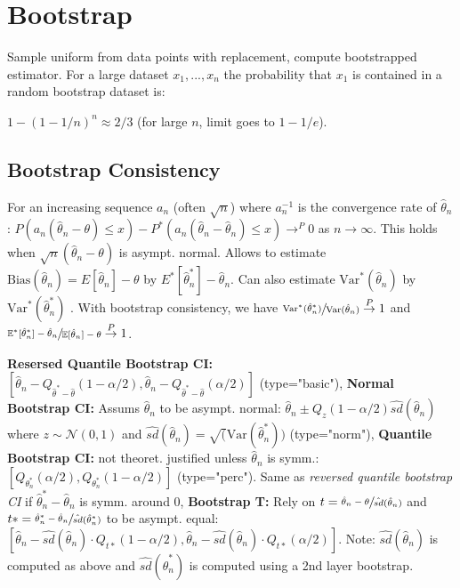 \section*{Bootstrap}
Sample uniform from data points with replacement, compute bootstrapped estimator. 
For a large dataset $x_1, ..., x_n$ the probability that $x_1$ is contained in a random bootstrap dataset is:

$1-(1-1/n)^n \approx 2/3$ (for large $n$, limit goes to $1-1/e$).
\subsection*{Bootstrap Consistency}
For an increasing sequence $a_n$ (often $\sqrt{n}$) where $a_n^{-1}$ is the convergence rate of $\hat \theta_n$:
$P(a_n(\hat \theta_n - \theta) \leq x) - P^*(a_n(\hat \theta_n - \hat \theta_n) \leq x) \to^P 0$ as $n\to \infty$. 
This holds when $\sqrt{n}(\hat \theta_n - \theta)$ is asympt. normal. Allows to estimate $\text{Bias}(\hat \theta_n) = E[\hat \theta_n] - \theta$ by $E^*[\hat \theta^*_n] - \hat \theta_n$. Can also estimate $\text{Var}^*(\hat\theta_n)$ by $\text{Var}^*(\hat\theta^*_n)$ .
With bootstrap consistency, we have $\sfrac{\textup{Var}^\ast(\hat\theta_n^\ast)}{\textup{Var}(\hat\theta_n)}\stackrel{P}{\rightarrow}1$ 
and $\sfrac{\mathbb{E}^\ast[\hat\theta_n^\ast]-\hat\theta_n}{\mathbb{E}[\hat\theta_n]-\theta}\stackrel{P}{\rightarrow}1$.

\textbf{Resersed Quantile Bootstrap CI:} $[\hat \theta_n - Q_{\hat \theta^* - \hat \theta}(1- \alpha / 2), \hat \theta_n - Q_{\hat \theta^* - \hat \theta}(\alpha / 2)]$ (type="basic"), \textbf{Normal Bootstrap CI:} Assums $\hat\theta_n$ to be asympt. normal: $\hat\theta_n \pm Q_z(1-\alpha / 2)\hat{sd}(\hat\theta_n)$ where $z \sim \mathcal{N}(0,1)$ and $\hat{sd}(\hat\theta_n)=\sqrt ({\text{Var}(\hat\theta_n^*)})$ (type="norm"), \textbf{Quantile Bootstrap CI:} not theoret. justified unless $\hat\theta_n$ is symm.:
$[Q_{\theta_n^*}(\alpha / 2), Q_{\theta_n^*}(1-\alpha / 2)]$ (type="perc"). 
Same as \textit{reversed quantile bootstrap CI} if $\hat\theta_n^* - \hat\theta_n$ is symm. around 0, 
\textbf{Bootstrap T:} Rely on $t=\sfrac{\hat\theta_n -\theta}{\hat {sd}(\hat\theta_n)}$ and $t*=\sfrac{\hat\theta_n^*-\hat\theta_n}{\hat{sd}(\hat\theta_n^*)}$ to be asympt. equal: 
$[\hat\theta_n - \hat{sd}(\hat\theta_n) \cdot Q_{t*}(1-\alpha / 2), \hat\theta_n - \hat{sd}(\hat\theta_n) \cdot Q_{t*}(\alpha / 2)]$. 
Note: $\hat{sd}(\hat\theta_n)$ is computed as above and $\hat{sd}(\hat\theta^*_n)$ is computed using a 2nd layer bootstrap.


